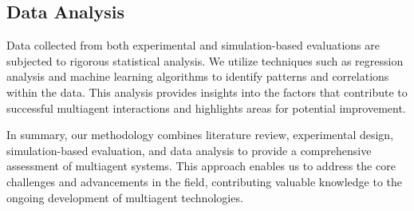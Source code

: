 \subsection{Data Analysis}
Data collected from both experimental and simulation-based evaluations are subjected to rigorous statistical analysis. We utilize techniques such as regression analysis and machine learning algorithms to identify patterns and correlations within the data. This analysis provides insights into the factors that contribute to successful multiagent interactions and highlights areas for potential improvement.

In summary, our methodology combines literature review, experimental design, simulation-based evaluation, and data analysis to provide a comprehensive assessment of multiagent systems. This approach enables us to address the core challenges and advancements in the field, contributing valuable knowledge to the ongoing development of multiagent technologies.